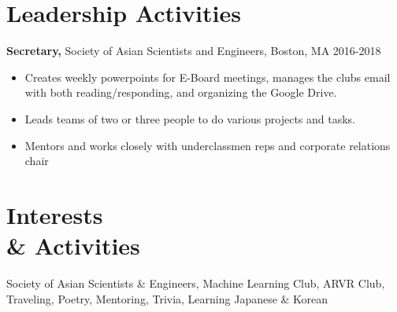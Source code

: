 \documentclass[margin]{res}
\begin{document}
\begin{resume}
\section{Leadership   Activities} 
               {\bf Secretary,} Society of Asian Scientists and Engineers, Boston, MA    \hfill         2016-2018
                \begin{itemize} \itemsep -0.5pt
                \item Creates weekly powerpoints for E-Board meetings, manages the clubs email with both reading/responding, and organizing the Google Drive.
                \item Leads teams of two or three people to do various projects and tasks.
              \item Mentors and works closely with underclassmen reps and corporate relations chair

		 \end{itemize}
 

 
\section{Interests \\ \& Activities}
Society of Asian Scientists \& Engineers, Machine Learning Club, ARVR Club, Traveling, Poetry, Mentoring, Trivia, Learning Japanese \& Korean
\end{resume} 
\end{document}
